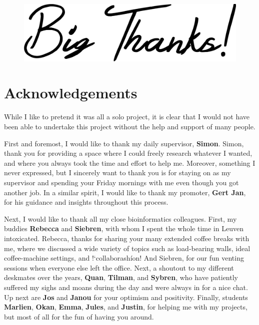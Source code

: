 \vspace*{\fill}
\begin{figure}[H]
    \centering
    \includegraphics[width=0.8\linewidth]{ch.appendix/imgs/bigthanks.png}
\end{figure}
\vspace*{\fill}

\newpage

\section{Acknowledgements}

\noindent
While I like to pretend it was all a solo project, it is clear that I would not have been able to undertake this project without the help and support of many people.

\bigbreak \noindent
First and foremost, I would like to thank my daily supervisor, \textbf{Simon}. Simon, thank you for providing a space where I could freely research whatever I wanted, and where you always took the time and effort to help me. Moreover, something I never expressed, but I sincerely want to thank you is for staying on as my supervisor and spending your Friday mornings with me even though you got another job. In a similar spirit, I would like to thank my promoter, \textbf{Gert Jan}, for his guidance and insights throughout this process.

\bigbreak \noindent
Next, I would like to thank all my close bioinformatics colleagues. First, my buddies \textbf{Rebecca} and \textbf{Siebren}, with whom I spent the whole time in Leuven intoxicated. Rebecca, thanks for sharing your many extended coffee breaks with me, where we discussed a wide variety of topics such as load-bearing walls, ideal coffee-machine settings, and !`collaborash\'ion! And Siebren, for our fun venting sessions when everyone else left the office. Next, a shoutout to my different deskmates over the years, \textbf{Quan}, \textbf{Tilman}, and \textbf{Sybren}, who have patiently suffered my sighs and moans during the day and were always in for a nice chat. Up next are \textbf{Jos} and \textbf{Janou} for your optimism and positivity. Finally,  students \textbf{Marlien}, \textbf{Okan}, \textbf{Emma}, \textbf{Jules}, and \textbf{Justin}, for helping me with my projects, but most of all for the fun of having you around. 

